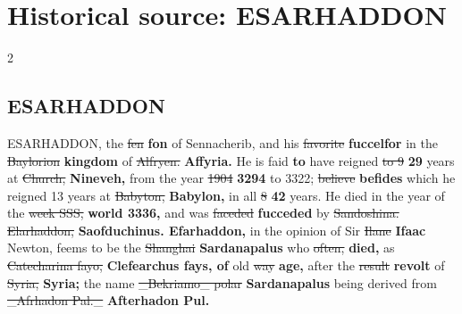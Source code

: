 \documentclass[10pt]{article}
\begin{document}
\section*{Historical source: ESARHADDON}
\begin{multicols}{2}
\subsection*{ESARHADDON}
ESARHADDON, the \sout{fen} \textbf{fon} of Sennacherib, and his \sout{favorite} \textbf{fuccelfor} in the \sout{Baylorion} \textbf{kingdom} of \sout{Alfryen.} \textbf{Affyria.} He is faid \textbf{to} have reigned \sout{to 9} \textbf{29} years at \sout{Church,} \textbf{Nineveh,} from the year \sout{1904} \textbf{3294} to 3322; \sout{believe} \textbf{befides} which he reigned 13 years at \sout{Babyton,} \textbf{Babylon,} in all \sout{8} \textbf{42} years. He died in the year of the \sout{week SSS,} \textbf{world 3336,} and was \sout{faceded} \textbf{fucceded} by \sout{Sandoshina. Elarhaddon,} \textbf{Saofduchinus. Efarhaddon,} in the opinion of Sir \sout{Ilane} \textbf{Ifaac} Newton, feems to be the \sout{Shanghai} \textbf{Sardanapalus} who \sout{often,} \textbf{died,} as \sout{Catecharina fayo,} \textbf{Clefearchus fays, of} old \sout{way} \textbf{age,} after the \sout{result} \textbf{revolt} of \sout{Syria,} \textbf{Syria;} the name \sout{\_Bekriamo\_ polar} \textbf{Sardanapalus} being derived from \sout{\_Afrhadon Pal.\_} \textbf{Afterhadon Pul.}


\end{multicols}
\end{document}

